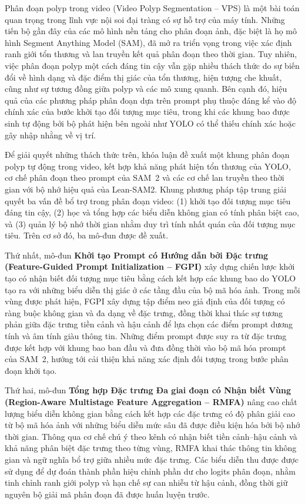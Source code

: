 Phân đoạn polyp trong video (Video Polyp Segmentation -- VPS) là một
bài toán quan trọng trong lĩnh vực nội soi đại tràng có sự hỗ trợ của
máy tính. Những tiến bộ gần đây của các mô hình nền tảng cho phân đoạn
ảnh, đặc biệt là họ mô hình Segment Anything Model (SAM), đã mở ra
triển vọng trong việc xác định ranh giới tổn thương và lan truyền
kết quả phân đoạn theo thời gian. Tuy nhiên, việc phân đoạn polyp
một cách đáng tin cậy vẫn gặp nhiều thách thức do sự biến đổi về
hình dạng và đặc điểm thị giác của tổn thương, hiện tượng che khuất,
cũng như sự tương đồng giữa polyp và các mô xung quanh. Bên cạnh đó,
hiệu quả của các phương pháp phân đoạn dựa trên prompt phụ thuộc
đáng kể vào độ chính xác của bước khởi tạo đối tượng mục tiêu, trong
khi các khung bao được sinh tự động bởi bộ phát hiện bên ngoài như
YOLO có thể thiếu chính xác hoặc gây nhập nhằng về vị trí.

Để giải quyết những thách thức trên, khóa luận đề xuất một khung
phân đoạn polyp tự động trong video, kết hợp khả năng phát hiện
tổn thương của YOLO, cơ chế phân đoạn theo prompt của SAM~2 và
các cơ chế lan truyền theo thời gian với bộ nhớ hiệu quả của
Lean-SAM2. Khung phương pháp tập trung giải quyết ba vấn đề bổ
trợ trong phân đoạn video: (1) khởi tạo đối tượng mục tiêu đáng
tin cậy, (2) học và tổng hợp các biểu diễn không gian có tính
phân biệt cao, và (3) quản lý bộ nhớ thời gian nhằm duy trì
tính nhất quán của đối tượng mục tiêu. Trên cơ sở đó, ba mô-đun
được đề xuất.

Thứ nhất, mô-đun \textbf{Khởi tạo Prompt có Hướng dẫn bởi Đặc trưng
(Feature-Guided Prompt Initialization -- FGPI)} xây dựng chiến
lược khởi tạo có nhận biết đối tượng mục tiêu bằng cách kết hợp
các khung bao do YOLO tạo ra với những biểu diễn thị giác ở
các tầng đầu của bộ mã hóa ảnh. Trong mỗi vùng được phát hiện,
FGPI xây dựng tập điểm neo giả định của đối tượng có ràng buộc
không gian và đa dạng về đặc trưng, đồng thời khai thác sự tương
phản giữa đặc trưng tiền cảnh và hậu cảnh để lựa chọn các điểm
prompt dương tính và âm tính giàu thông tin. Những điểm prompt
được suy ra từ đặc trưng được kết hợp với khung bao ban đầu và
đưa đồng thời vào bộ mã hóa prompt của SAM~2, hướng tới cải thiện
khả năng xác định đối tượng trong bước phân đoạn khởi tạo.

Thứ hai, mô-đun \textbf{Tổng hợp Đặc trưng Đa giai đoạn có Nhận biết
Vùng (Region-Aware Multistage Feature Aggregation -- RMFA)}
nâng cao chất lượng biểu diễn không gian bằng cách kết hợp các
đặc trưng có độ phân giải cao từ bộ mã hóa ảnh với những biểu
diễn mức sâu đã được điều kiện hóa bởi bộ nhớ thời gian. Thông
qua cơ chế chú ý theo kênh có nhận biết tiền cảnh--hậu cảnh
và khả năng phân biệt đặc trưng theo từng vùng, RMFA khai
thác thông tin không gian và ngữ nghĩa bổ trợ giữa nhiều mức
đặc trưng. Các biểu diễn thu được được sử dụng để dự đoán
thành phần hiệu chỉnh phần dư cho logits phân đoạn, nhằm tinh
chỉnh ranh giới polyp và hạn chế sự can nhiễu từ hậu cảnh,
đồng thời giữ nguyên bộ giải mã phân đoạn đã được huấn luyện
trước.

